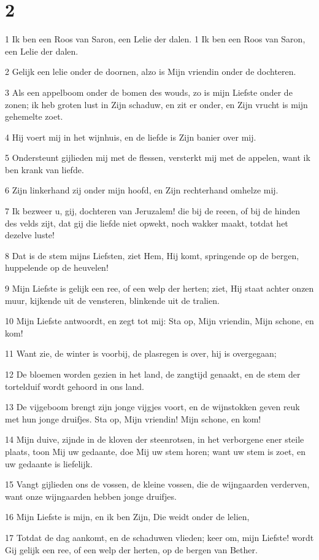 \chapter{2}

\par 1 Ik ben een Roos van Saron, een Lelie der dalen.  1  Ik ben een Roos van Saron, een Lelie der dalen.
\par 2 Gelijk een lelie onder de doornen, alzo is Mijn vriendin onder de dochteren.
\par 3 Als een appelboom onder de bomen des wouds, zo is mijn Liefste onder de zonen; ik heb groten lust in Zijn schaduw, en zit er onder, en Zijn vrucht is mijn gehemelte zoet.
\par 4 Hij voert mij in het wijnhuis, en de liefde is Zijn banier over mij.
\par 5 Ondersteunt gijlieden mij met de flessen, versterkt mij met de appelen, want ik ben krank van liefde.
\par 6 Zijn linkerhand zij onder mijn hoofd, en Zijn rechterhand omhelze mij.
\par 7 Ik bezweer u, gij, dochteren van Jeruzalem! die bij de reeen, of bij de hinden des velds zijt, dat gij die liefde niet opwekt, noch wakker maakt, totdat het dezelve luste!
\par 8 Dat is de stem mijns Liefsten, ziet Hem, Hij komt, springende op de bergen, huppelende op de heuvelen!
\par 9 Mijn Liefste is gelijk een ree, of een welp der herten; ziet, Hij staat achter onzen muur, kijkende uit de vensteren, blinkende uit de tralien.
\par 10 Mijn Liefste antwoordt, en zegt tot mij: Sta op, Mijn vriendin, Mijn schone, en kom!
\par 11 Want zie, de winter is voorbij, de plasregen is over, hij is overgegaan;
\par 12 De bloemen worden gezien in het land, de zangtijd genaakt, en de stem der tortelduif wordt gehoord in ons land.
\par 13 De vijgeboom brengt zijn jonge vijgjes voort, en de wijnstokken geven reuk met hun jonge druifjes. Sta op, Mijn vriendin! Mijn schone, en kom!
\par 14 Mijn duive, zijnde in de kloven der steenrotsen, in het verborgene ener steile plaats, toon Mij uw gedaante, doe Mij uw stem horen; want uw stem is zoet, en uw gedaante is liefelijk.
\par 15 Vangt gijlieden ons de vossen, de kleine vossen, die de wijngaarden verderven, want onze wijngaarden hebben jonge druifjes.
\par 16 Mijn Liefste is mijn, en ik ben Zijn, Die weidt onder de lelien,
\par 17 Totdat de dag aankomt, en de schaduwen vlieden; keer om, mijn Liefste! wordt Gij gelijk een ree, of een welp der herten, op de bergen van Bether.

